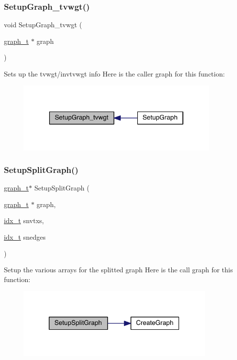 \subsubsection{\texorpdfstring{Setup\+Graph\+\_\+tvwgt()}{SetupGraph\_tvwgt()}}
{\footnotesize\ttfamily void Setup\+Graph\+\_\+tvwgt (\begin{DoxyParamCaption}\item[{\hyperlink{a00734}{graph\+\_\+t} $\ast$}]{graph }\end{DoxyParamCaption})}

Set\textquotesingle{}s up the tvwgt/invtvwgt info Here is the caller graph for this function\+:\nopagebreak
\begin{figure}[H]
\begin{center}
\leavevmode
\includegraphics[width=286pt]{a00849_a274db8b39f4bc294fcb5757b01ae31f1_icgraph}
\end{center}
\end{figure}
\mbox{\label{a00849_ad1dfd83fc2dc5e9f855c2d86b960c809}} 
\subsubsection{\texorpdfstring{Setup\+Split\+Graph()}{SetupSplitGraph()}}
{\footnotesize\ttfamily \hyperlink{a00734}{graph\+\_\+t}$\ast$ Setup\+Split\+Graph (\begin{DoxyParamCaption}\item[{\hyperlink{a00734}{graph\+\_\+t} $\ast$}]{graph,  }\item[{\hyperlink{a00876_aaa5262be3e700770163401acb0150f52}{idx\+\_\+t}}]{snvtxs,  }\item[{\hyperlink{a00876_aaa5262be3e700770163401acb0150f52}{idx\+\_\+t}}]{snedges }\end{DoxyParamCaption})}

Setup the various arrays for the splitted graph Here is the call graph for this function\+:\nopagebreak
\begin{figure}[H]
\begin{center}
\leavevmode
\includegraphics[width=280pt]{a00849_ad1dfd83fc2dc5e9f855c2d86b960c809_cgraph}
\end{center}
\end{figure}
